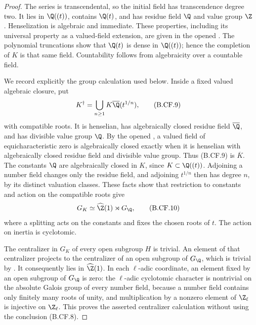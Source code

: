 \begin{proof}
The series is transcendental, so the initial field has transcendence
degree two. It lies in \(\Q((t))\), contains \(\Q(t)\), and has
residue field \(\Q\) and value group \(\Z\). Henselization is
algebraic and immediate. These properties, including its universal
property as a valued-field extension, are given in the opened
\citep[Proposition~3.3.25 and Corollary~3.3.26]{ADH2017}.
The polynomial truncations show that \(\Q(t)\) is dense in
\(\Q((t))\); hence the completion of \(K\) is that same field.
Countability follows from algebraicity over a countable field.

We record explicitly the group calculation used below. Inside a fixed
valued algebraic closure, put
\[
                  K^\dagger=\bigcup_{n\geq1}
                         K\overline{\Q}(t^{1/n}),
                                                        \tag{B.CF.9}
\]
with compatible roots. It is henselian, has algebraically closed
residue field \(\overline\Q\), and has divisible value group
\(\Q\). By the opened
\citep[Corollary~3.3.22]{ADH2017}, a valued field of equicharacteristic
zero is algebraically closed exactly when it is henselian with
algebraically closed residue field and divisible value group.
Thus (B.CF.9) is \(\overline K\). The constants \(\Q\) are
algebraically closed in \(K\), since \(K\subset\Q((t))\).
Adjoining a number field changes only the residue field, and adjoining
\(t^{1/n}\) then has degree \(n\), by its distinct valuation classes.
These facts show that restriction to constants and action on the
compatible roots give
\[
        G_K\simeq\widehat\Z(1)\rtimes G_\Q,             \tag{B.CF.10}
\]
where a splitting acts on the constants and fixes the chosen roots
of \(t\). The action on inertia is cyclotomic.

The centralizer in \(G_K\) of every open subgroup \(H\) is trivial.
An element of that centralizer projects to the centralizer of an
open subgroup of \(G_\Q\), which is trivial by
\citep[Corollary~4.5(3) and Definition~4.3]{HoshiTsujimura2023}.
It consequently lies in \(\widehat\Z(1)\). In each \(\ell\)-adic
coordinate, an element fixed by an open subgroup of \(G_\Q\) is
zero: the \(\ell\)-adic cyclotomic character is nontrivial on the
absolute Galois group of every number field, because a number field
contains only finitely many roots of unity, and multiplication by a
nonzero element of \(\Z_\ell\) is injective on \(\Z_\ell\).
This proves the asserted centralizer calculation without using the
conclusion (B.CF.8).


\end{proof}
